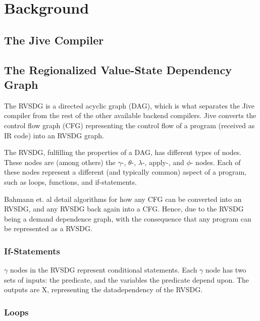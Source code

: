 
\section{Background}
\label{background}

\subsection{The Jive Compiler}
\label{background:jive}


\subsection{The Regionalized Value-State Dependency Graph}
\label{background:RVSDG}

The RVSDG is a directed acyclic graph (DAG), which is what separates the Jive
compiler from the rest of the other available backend compilers. Jive converts
the control flow graph (CFG) representing the control flow of a program
(received as IR code) into an RVSDG graph.

The RVSDG, fulfilling the properties of a DAG, has different types of nodes.
These nodes are (among others) the $\gamma$-, $\theta$-, $\lambda$-, apply-, and
$\phi$- nodes. Each of these nodes represent a different (and typically common)
aspect of a program, such as loops, functions, and if-statements.

Bahmann et. al detail algorithms for how any CFG can be
converted into an RVSDG, and any RVSDG back again into a CFG. Hence, due to the
RVSDG being a demand dependence graph, with the consequence that any program can
be represented as a RVSDG.

\subsubsection{If-Statements}

\textit{$\gamma$} nodes in the RVSDG represent conditional statements. Each
$\gamma$ node has two sets of inputs: the predicate, and the variables the predicate depend upon. The outputs are
X, representing the datadependency of the RVSDG.

\subsubsection{Loops}

